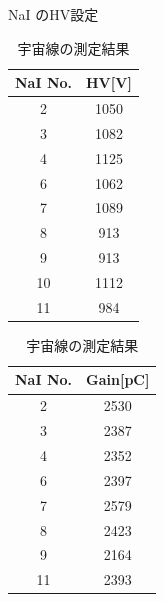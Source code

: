 \begin{table}[H]
  \begin{minipage}[t]{0.45\textwidth}
    \begin{center}
    \caption{NaI のHV設定}\label{HV}
      \begin{tabular}{|c|c|}\hline
      NaI No.&HV[V]\\ \hline \hline
      2 & 1050 \\ \hline
      3 & 1082 \\ \hline
      4 & 1125 \\ \hline
      6 & 1062 \\ \hline
      7 & 1089 \\ \hline
      8 & 913 \\ \hline
      9 & 913 \\ \hline
      10 & 1112 \\ \hline
      11 & 984 \\ \hline
      \end{tabular}
    \end{center}
  \end{minipage}
  \hfill
  \begin{minipage}[t]{0.45\textwidth}
    \begin{center}
    \caption{宇宙線の測定結果}\label{nai_gain}
      \begin{tabular}{|c|c|}\hline
        NaI No. & Gain[pC]\\ \hline \hline
        2 & 2530 \\ \hline
        3 &2387 \\ \hline
        4 &2352 \\ \hline
        6 &2397 \\ \hline
        7  &2579 \\ \hline
        8  &2423 \\ \hline
        9  &2164 \\ \hline
        11  &2393 \\ \hline
      \end{tabular}
    \end{center}
  \end{minipage}
\end{table}

